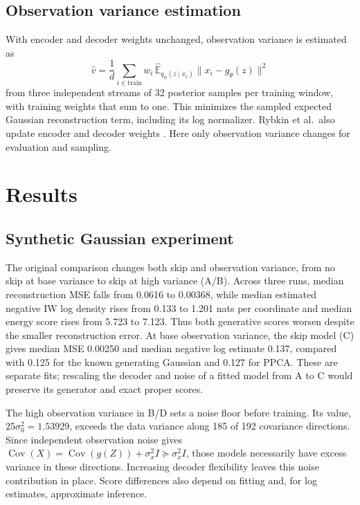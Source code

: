 \documentclass{article}
\newcommand{\E}{\mathbb{E}}
\begin{document}
\subsection{Observation variance estimation}
With encoder and decoder weights unchanged, observation variance is estimated as
\begin{equation}
\hat v=\frac{1}{d}\sum_{i\in\mathrm{train}}w_i\,\widehat{\E}_{q_\phi(z\mid x_i)}\|x_i-g_\theta(z)\|^2
\label{eq:variance_refit}
\end{equation}
from three independent streams of 32 posterior samples per training window, with training weights that sum to one. This minimizes the sampled expected Gaussian reconstruction term, including its log normalizer. Rybkin et al.\ also update encoder and decoder weights \citep{Rybkin2021CalibratedDecoders}. Here only observation variance changes for evaluation and sampling.

\section{Results}
\subsection{Synthetic Gaussian experiment}
The original comparison changes both skip and observation variance, from no skip at base variance to skip at high variance (A/B). Across three runs, median reconstruction MSE falls from 0.0616 to 0.00368, while median estimated negative IW log density rises from 0.133 to 1.201 nats per coordinate and median energy score rises from 5.723 to 7.123. Thus both generative scores worsen despite the smaller reconstruction error. At base observation variance, the skip model (C) gives median MSE 0.00250 and median negative log estimate 0.137, compared with 0.125 for the known generating Gaussian and 0.127 for PPCA. These are separate fits; rescaling the decoder and noise of a fitted model from A to C would preserve its generator and exact proper scores.

The high observation variance in B/D sets a noise floor before training. Its value, $25\sigma_0^2=1.53929$, exceeds the data variance along 185 of 192 covariance directions. Since independent observation noise gives $\operatorname{Cov}(X)=\operatorname{Cov}(g(Z))+\sigma_x^2I\succeq\sigma_x^2I$, those models necessarily have excess variance in these directions. Increasing decoder flexibility leaves this noise contribution in place. Score differences also depend on fitting and, for log estimates, approximate inference.
\end{document}
